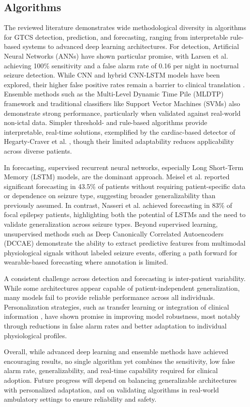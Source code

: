 \subsection{Algorithms}
The reviewed literature demonstrates wide methodological diversity in algorithms for GTCS detection, prediction, and forecasting, ranging from interpretable rule-based systems to advanced deep learning architectures. For detection, Artificial Neural Networks (ANNs) have shown particular promise, with Larsen et al. \cite{Larsen2024-vn} achieving 100\% sensitivity and a false alarm rate of 0.16 per night in nocturnal seizure detection. While CNN and hybrid CNN-LSTM models have been explored, their higher false positive rates remain a barrier to clinical translation \cite{Yu2023-ss, Tang2021-td}. Ensemble methods such as the Multi-Level Dynamic Time Pile (MLDTP) framework \cite{Wu2024-yl} and traditional classifiers like Support Vector Machines (SVMs) \cite{Poh2012-af} also demonstrate strong performance, particularly when validated against real-world non-ictal data. Simpler threshold- and rule-based algorithms provide interpretable, real-time solutions, exemplified by the cardiac-based detector of Hegarty-Craver et al. \cite{Hegarty-Craver2021-hk}, though their limited adaptability reduces applicability across diverse patients.

In forecasting, supervised recurrent neural networks, especially Long Short-Term Memory (LSTM) models, are the dominant approach. Meisel et al. \cite{Meisel2020-ii} reported significant forecasting in 43.5\% of patients without requiring patient-specific data or dependence on seizure type, suggesting broader generalizability than previously assumed. In contrast, Nasseri et al. \cite{Nasseri2021-ny} achieved forecasting in 83\% of focal epilepsy patients, highlighting both the potential of LSTMs and the need to validate generalization across seizure types. Beyond supervised learning, unsupervised methods such as Deep Canonically Correlated Autoencoders (DCCAE) \cite{Vieluf2023-ta} demonstrate the ability to extract predictive features from multimodal physiological signals without labeled seizure events, offering a path forward for wearable-based forecasting where annotation is limited.

A consistent challenge across detection and forecasting is inter-patient variability. While some architectures appear capable of patient-independent generalization, many models fail to provide reliable performance across all individuals. Personalization strategies, such as transfer learning \cite{Nasseri2021-xn} or integration of clinical information \cite{Vieluf2023-zv}, have shown promise in improving model robustness, most notably through reductions in false alarm rates and better adaptation to individual physiological profiles.

Overall, while advanced deep learning and ensemble methods have achieved encouraging results, no single algorithm yet combines the sensitivity, low false alarm rate, generalizability, and real-time capability required for clinical adoption. Future progress will depend on balancing generalizable architectures with personalized adaptation, and on validating algorithms in real-world ambulatory settings to ensure reliability and safety.
